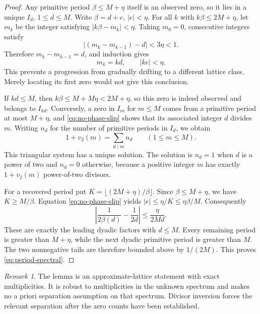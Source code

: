 \documentclass[11pt,a4paper]{article}
\numberwithin{equation}{section}
\theoremstyle{definition}
\theoremstyle{remark}
\newtheorem{remark}[theorem]{Remark}
\begin{document}
\begin{proof}
Any primitive period $\beta\le M+\eta$ itself is an observed zero, so it lies
in a unique $I_d$, $1\le d\le M$. Write $\beta=d+e$, $|e|<\eta$.
For all $k$ with $k\beta\le2M+\eta$, let $m_k$ be the integer satisfying
$|k\beta-m_k|<\eta$. Taking $m_0=0$, consecutive integers satisfy
\[
 |(m_k-m_{k-1})-d|<3\eta<1.
\]
Therefore $m_k-m_{k-1}=d$, and induction gives
\begin{equation}
 m_k=kd,\qquad |ke|<\eta.
 \label{eq:no-phase-slip}
\end{equation}
This prevents a progression from gradually drifting to a different lattice
class. Merely locating its first zero would not give this conclusion.

If $kd\le M$, then $k\beta\le M+M\eta<2M+\eta$, so this zero is indeed
observed and belongs to $I_{kd}$. Conversely, a zero in $I_m$ for $m\le M$
comes from a primitive period at most $M+\eta$, and \eqref{eq:no-phase-slip}
shows that its associated integer $d$ divides $m$.
Writing $n_d$ for the number of primitive periods in $I_d$, we obtain
\begin{equation}
 1+v_2(m)=\sum_{d\mid m}n_d\qquad(1\le m\le M).
 \label{eq:divisor-system}
\end{equation}
This triangular system has a unique solution. The solution is $n_d=1$ when
$d$ is a power of two and $n_d=0$ otherwise, because a positive integer $m$
has exactly $1+v_2(m)$ power-of-two divisors.

For a recovered period put $K=\lfloor(2M+\eta)/\beta\rfloor$. Since
$\beta\le M+\eta$, we have $K\ge M/\beta$. Equation
\eqref{eq:no-phase-slip} yields $|e|\le\eta/K\le\eta\beta/M$.
Consequently
\[
 \left|\frac1{2\beta(d)}-\frac1{2d}\right|
 \le\frac{\eta}{2Md}.
\]
These are exactly the leading dyadic factors with $d\le M$. Every remaining
period is greater than $M+\eta$, while the next dyadic primitive period is
greater than $M$. The two nonnegative tails are therefore bounded above by
$1/(2M)$. This proves \eqref{eq:period-spectral}.
\end{proof}

\begin{remark}
The lemma is an approximate-lattice statement with exact multiplicities.
It is robust to multiplicities in the unknown spectrum and makes no a priori
separation assumption on that spectrum. Divisor inversion forces the relevant
separation after the zero counts have been established.
\end{remark}
\end{document}
